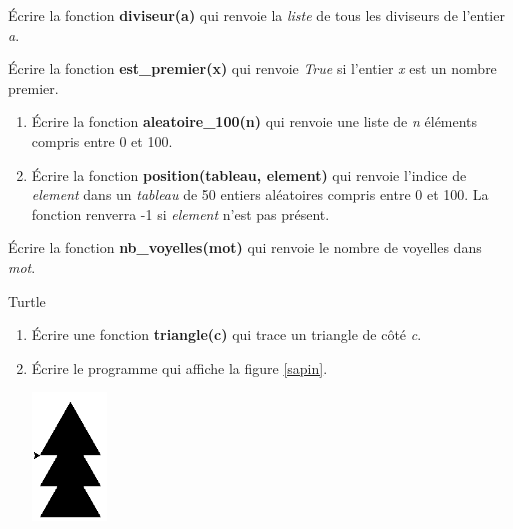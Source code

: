 \documentclass[a4paper,11pt]{article}
\begin{document}
\begin{Form}
\begin{exo}
Écrire la fonction \textbf{diviseur(a)} qui renvoie la \emph{liste} de tous les diviseurs de l'entier \emph{a}.
\end{exo}
\begin{exo}
Écrire la fonction \textbf{est\_premier(x)} qui renvoie \emph{True} si l'entier \emph{x} est un nombre premier.
\end{exo}
\begin{exo}
\begin{enumerate}
\item Écrire la fonction \textbf{aleatoire\_100(n)} qui renvoie une liste de \emph{n} éléments compris entre 0 et 100.
\item Écrire la fonction \textbf{position(tableau, element)} qui renvoie l'indice de \emph{element} dans un \emph{tableau} de 50 entiers aléatoires compris entre 0 et 100. La fonction renverra -1 si \emph{element} n'est pas présent.
\end{enumerate}
\end{exo}
\begin{exo}
Écrire la fonction \textbf{nb\_voyelles(mot)} qui renvoie le nombre de voyelles dans \emph{mot}.
\end{exo}
\begin{exo}
Turtle
\begin{enumerate}
\item Écrire une fonction \textbf{triangle(c)} qui trace un triangle de côté \emph{c}.
\item Écrire le programme qui affiche la figure \ref{sapin}.
\begin{center}
\centering
\includegraphics[width=2cm]{ressources/sapin.png}
\label{sapin}
\end{center}
\end{enumerate}
\end{exo}
\end{Form}
\end{document}

